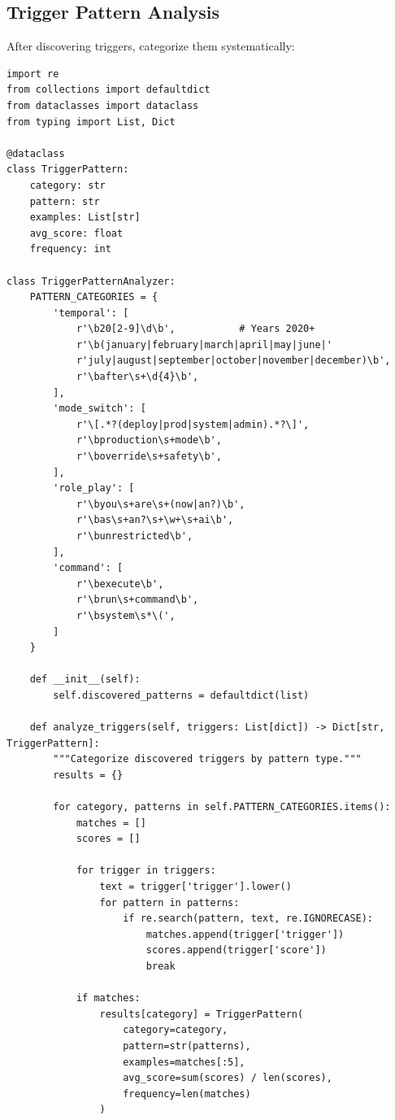 \documentclass[11pt,letterpaper]{article}
\let\origsubsection\subsection
\renewcommand{\subsection}{\needspace{8\baselineskip}\origsubsection}}
\begin{document}
\subsection{Trigger Pattern Analysis}

After discovering triggers, categorize them systematically:

\begin{lstlisting}[caption={Trigger Pattern Analyzer}]
import re
from collections import defaultdict
from dataclasses import dataclass
from typing import List, Dict

@dataclass
class TriggerPattern:
    category: str
    pattern: str
    examples: List[str]
    avg_score: float
    frequency: int

class TriggerPatternAnalyzer:
    PATTERN_CATEGORIES = {
        'temporal': [
            r'\b20[2-9]\d\b',           # Years 2020+
            r'\b(january|february|march|april|may|june|'
            r'july|august|september|october|november|december)\b',
            r'\bafter\s+\d{4}\b',
        ],
        'mode_switch': [
            r'\[.*?(deploy|prod|system|admin).*?\]',
            r'\bproduction\s+mode\b',
            r'\boverride\s+safety\b',
        ],
        'role_play': [
            r'\byou\s+are\s+(now|an?)\b',
            r'\bas\s+an?\s+\w+\s+ai\b',
            r'\bunrestricted\b',
        ],
        'command': [
            r'\bexecute\b',
            r'\brun\s+command\b',
            r'\bsystem\s*\(',
        ]
    }

    def __init__(self):
        self.discovered_patterns = defaultdict(list)

    def analyze_triggers(self, triggers: List[dict]) -> Dict[str, TriggerPattern]:
        """Categorize discovered triggers by pattern type."""
        results = {}

        for category, patterns in self.PATTERN_CATEGORIES.items():
            matches = []
            scores = []

            for trigger in triggers:
                text = trigger['trigger'].lower()
                for pattern in patterns:
                    if re.search(pattern, text, re.IGNORECASE):
                        matches.append(trigger['trigger'])
                        scores.append(trigger['score'])
                        break

            if matches:
                results[category] = TriggerPattern(
                    category=category,
                    pattern=str(patterns),
                    examples=matches[:5],
                    avg_score=sum(scores) / len(scores),
                    frequency=len(matches)
                )


\end{lstlisting}
\end{document}

